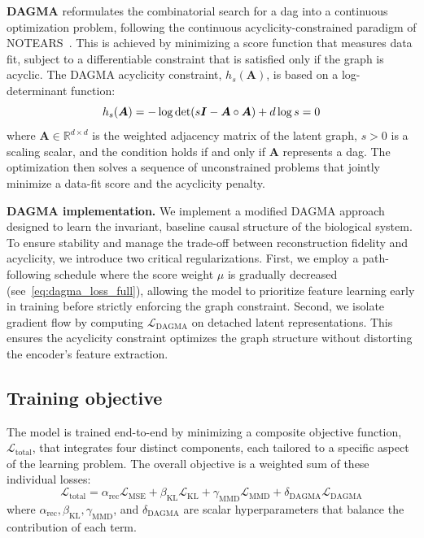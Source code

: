 \documentclass[10pt,letterpaper]{article}
\def\mA{{\bm{A}}}\def\mB{{\bm{B}}}\def\mC{{\bm{C}}}
\theoremstyle{definition}
\theoremstyle{remark}
\newcommand{\realnumbers}{\mathbb{R}}
\newcommand{\identitymatrix}{\mI}
\newcommand{\graphmatrix}{\mA}
\newcommand{\latentdim}{d}
\newcommand{\mseloss}{\mathcal{L}_{\text{MSE}}}
\newcommand{\kldloss}{\mathcal{L}_{\text{KL}}}
\newcommand{\mmdloss}{\mathcal{L}_{\text{MMD}}}
\newcommand{\dagmaloss}{\mathcal{L}_{\text{DAGMA}}}
\newcommand{\totalloss}{\mathcal{L}_{\text{total}}}
\newcommand{\acyclicityfunc}{h}
\newcommand{\alpharec}{\alpha_{\text{rec}}}
\newcommand{\betakl}{\beta_{\text{KL}}}
\newcommand{\gammammd}{\gamma_{\text{MMD}}}
\newcommand{\deltadagma}{\delta_{\text{DAGMA}}}
\begin{document}
\textbf{DAGMA} reformulates the combinatorial search for a \gls{dag} into a continuous optimization problem, following the continuous acyclicity-constrained paradigm of NOTEARS~\cite{zheng2018dags}.
This is achieved by minimizing a score function that measures data fit, subject to a differentiable constraint that is satisfied only if the graph is acyclic.
The DAGMA acyclicity constraint, $\acyclicityfunc_s(\graphmatrix)$, is based on a log-determinant function:
\begin{equation}
    \acyclicityfunc_s(\graphmatrix) = -\log\det(s\identitymatrix - \graphmatrix \circ \graphmatrix) + \latentdim\log s = 0
\end{equation}
where $\graphmatrix \in \realnumbers^{\latentdim \times \latentdim}$ is the weighted adjacency matrix of the latent graph, $s > 0$ is a scaling scalar, and the condition holds if and only if $\graphmatrix$ represents a \gls{dag}.
The optimization then solves a sequence of unconstrained problems that jointly minimize a data-fit score and the acyclicity penalty.

\textbf{DAGMA implementation.} We implement a modified DAGMA approach designed to learn the invariant, baseline causal structure of the biological system.
To ensure stability and manage the trade-off between reconstruction fidelity and acyclicity, we introduce two critical regularizations.
First, we employ a path-following schedule where the score weight $\mu$ is gradually decreased (see~\cref{eq:dagma_loss_full}), allowing the model to prioritize feature learning early in training before strictly enforcing the graph constraint.
Second, we isolate gradient flow by computing $\dagmaloss$ on detached latent representations.
This ensures the acyclicity constraint optimizes the graph structure without distorting the encoder's feature extraction.

\subsection*{Training objective}
The model is trained end-to-end by minimizing a composite objective function, $\totalloss$, that integrates four distinct components, each tailored to a specific aspect of the learning problem.
The overall objective is a weighted sum of these individual losses:
\begin{equation}
    \totalloss = \alpharec\mseloss + \betakl\kldloss + \gammammd\mmdloss + \deltadagma\dagmaloss
    \label{eq:total_loss}
\end{equation}
where $\alpharec, \betakl, \gammammd$, and $\deltadagma$ are scalar hyperparameters that balance the contribution of each term.
\end{document}
